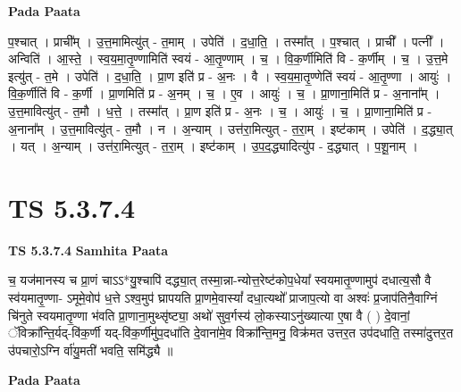 \documentclass[17pt]{extarticle}
\begin{document}
\textbf{Pada Paata} \newline

प॒श्चात् । प्राची᳚म् । उ॒त्त॒मामित्यु॑त् - त॒माम् । उपेति॑ । द॒धा॒ति॒ । तस्मा᳚त् । प॒श्चात् । प्राची᳚ । पत्नी᳚ । अन्विति॑ । आ॒स्ते॒ । स्व॒य॒मा॒तृ॒ण्णामिति॑ स्वयं - आ॒तृ॒ण्णाम् । च॒ । वि॒क॒र्णीमिति॑ वि - क॒र्णीम् । च॒ । उ॒त्त॒मे इत्यु॑त् - त॒मे । उपेति॑ । द॒धा॒ति॒ । प्रा॒ण इति॑ प्र - अ॒नः । वै । स्व॒य॒मा॒तृ॒ण्णेति॑ स्वयं - आ॒तृ॒ण्णा । आयुः॑ । वि॒क॒र्णीति॑ वि - क॒र्णी । प्रा॒णमिति॑ प्र - अ॒नम् । च॒ । ए॒व । आयुः॑ । च॒ । प्रा॒णाना॒मिति॑ प्र - अ॒नाना᳚म् । उ॒त्त॒मावित्यु॑त् - त॒मौ । ध॒त्ते॒ । तस्मा᳚त् । प्रा॒ण इति॑ प्र - अ॒नः । च॒ । आयुः॑ । च॒ । प्रा॒णाना॒मिति॑ प्र - अ॒नाना᳚म् । उ॒त्त॒मावित्यु॑त् - त॒मौ । न । अ॒न्याम् । उत्त॑रा॒मित्युत् - त॒रा॒म् । इष्ट॑काम् । उपेति॑ । द॒द्ध्या॒त् । यत् । अ॒न्याम् । उत्त॑रा॒मित्युत् - त॒रा॒म् । इष्ट॑काम् । उ॒प॒द॒द्ध्यादित्यु॑प - द॒द्ध्यात् । प॒शू॒नाम् ।  \newline




\section*{ TS 5.3.7.4 }

\textbf{TS 5.3.7.4 } \newline
\textbf{Samhita Paata} \newline

च॒ यज॑मानस्य च प्रा॒णं चाऽऽ*यु॒श्चापि॑ दद्ध्या॒त् तस्मा॒न्ना-न्योत्त॒रेष्ट॑कोप॒धेया᳚ स्वयमातृ॒ण्णामुप॑ दधात्य॒सौ वै स्व॑यमातृ॒ण्णा- ऽमूमे॒वोप॑ ध॒त्ते ऽश्व॒मुप॑ घ्रापयति प्रा॒णमे॒वास्यां᳚ दधा॒त्यथो᳚ प्राजाप॒त्यो वा अश्वः॑ प्र॒जाप॑तिनै॒वाग्निं चि॑नुते स्वयमातृ॒ण्णा भ॑वति प्रा॒णाना॒मुथ्सृ॑ष्ट्या॒ अथो॑ सुव॒र्गस्य॑ लो॒कस्याऽनु॑ख्यात्या ए॒षा वै ( ) दे॒वानां॒ ॅविक्रा᳚न्ति॒र्यद्-वि॑क॒र्णी यद्-वि॑क॒र्णीमु॑प॒दधा॑ति दे॒वाना॑मे॒व विक्रा᳚न्ति॒मनु॒ विक्र॑मत उत्तर॒त उप॑दधाति॒ तस्मा॑दुत्तर॒त उ॑पचारो॒ऽग्नि र्वा॑यु॒मती॑ भवति॒ समि॑द्ध्यै ॥ \newline

\textbf{Pada Paata} \newline
\end{document}
